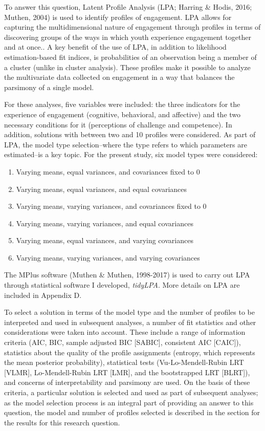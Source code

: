 \documentclass[]{msu-thesis}
\providecommand{\tightlist}{%
  \setlength{\itemsep}{0pt}\setlength{\parskip}{0pt}}
\theoremstyle{definition}
\theoremstyle{definition}
\theoremstyle{definition}
\theoremstyle{remark}
\begin{document}
To answer this question, Latent Profile Analysis (LPA; Harring \& Hodis,
2016; Muthen, 2004) is used to identify profiles of engagement. LPA
allows for capturing the multidimensional nature of engagement through
profiles in terms of discovering groups of the ways in which youth
experience engagement together and at once.. A key benefit of the use of
LPA, in addition to likelihood estimation-based fit indices, is
probabilities of an observation being a member of a cluster (unlike in
cluster analysis). These profiles make it possible to analyze the
multivariate data collected on engagement in a way that balances the
parsimony of a single model.

For these analyses, five variables were included: the three indicators
for the experience of engagement (cognitive, behavioral, and affective)
and the two necessary conditions for it (perceptions of challenge and
competence). In addition, solutions with between two and 10 profiles
were considered. As part of LPA, the model type selection--where the
type refers to which parameters are estimated--is a key topic. For the
present study, six model types were considered:

\begin{enumerate}
\def\labelenumi{\arabic{enumi}.}
\tightlist
\item
  Varying means, equal variances, and covariances fixed to 0
\item
  Varying means, equal variances, and equal covariances
\item
  Varying means, varying variances, and covariances fixed to 0
\item
  Varying means, varying variances, and equal covariances
\item
  Varying means, equal variances, and varying covariances
\item
  Varying means, varying variances, and varying covariances
\end{enumerate}

The MPlus software (Muthen \& Muthen, 1998-2017) is used to carry out
LPA through statistical software I developed, \emph{tidyLPA}. More
details on LPA are included in Appendix D.

To select a solution in terms of the model type and the number of
profiles to be interpreted and used in subsequent analyses, a number of
fit statistics and other considerations were taken into account. These
include a range of information criteria (AIC, BIC, sample adjusted BIC
{[}SABIC{]}, consistent AIC {[}CAIC{]}), statistics about the quality of
the profile assignments (entropy, which represents the mean posterior
probability), statistical tests (Vu-Lo-Mendell-Rubin LRT {[}VLMR{]},
Lo-Mendell-Rubin LRT {[}LMR{]}, and the bootstrapped LRT {[}BLRT{]}),
and concerns of interpretability and parsimony are used. On the basis of
these criteria, a particular solution is selected and used as part of
subsequent analyses; as the model selection process is an integral part
of providing an answer to this question, the model and number of
profiles selected is described in the section for the results for this
research question.
\end{document}

